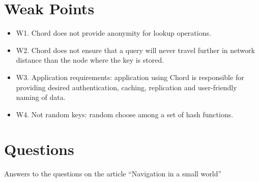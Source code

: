 \documentclass[10pt]{proc}
\begin{document}
\section{Weak Points}
\begin{itemize}
 \item W1. Chord does not provide anonymity for lookup operations.
 \item W2. Chord does not ensure that a query will never travel further in network distance than the node where the key is stored.
 \item W3. Application requirements: application using Chord is responsible for providing desired authentication, caching, replication and user-friendly naming of data.
 \item W4. Not random keys: random choose among a set of hash functions.
\end{itemize}



\newpage
\section{Questions}
Answers to the questions on the article ``Navigation in a small world'' \cite{kleinberg2000navigation}
\end{document}
